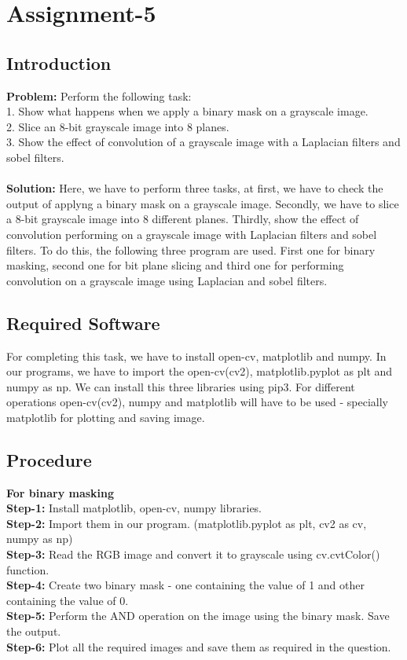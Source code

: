 \documentclass{article}
\begin{document}
{
    \section{Assignment-5}
    \subsection{Introduction}
    \textbf {Problem: }
    Perform the following task:\\
    1. Show what happens when we apply a binary mask on a grayscale image.\\
    2. Slice an 8-bit grayscale image into 8 planes.\\
    3. Show the effect of convolution of a grayscale image with a Laplacian filters and sobel filters.\\
    \\
    \textbf{Solution: }
    Here, we have to perform three tasks, at first, we have to check the output of applyng a binary mask on a grayscale image. Secondly, we have to slice a 8-bit grayscale image into 8 different planes. Thirdly, show the effect of convolution performing on a grayscale image with Laplacian filters and sobel filters. To do this, the following three program are used. First one for binary masking, second one for bit plane slicing and third one for performing convolution on a grayscale image using Laplacian and sobel filters.
    \\
    
    \subsection{Required Software}
    For completing this task, we have to install open-cv, matplotlib and numpy. In our programs, we have to import the open-cv(cv2), matplotlib.pyplot as plt and numpy as np. We can install this three libraries using pip3. For different operations open-cv(cv2), numpy and matplotlib will have to be used - specially matplotlib for plotting and saving image. 
    \\
    
    \subsection{Procedure}
    \textbf{For binary masking}\\
    \textbf{Step-1:}
    Install matplotlib, open-cv, numpy libraries.\\
    \textbf{Step-2:}
    Import them in our program. (matplotlib.pyplot as plt, cv2 as cv, numpy as np)\\
    \textbf{Step-3:}
    Read the RGB image and convert it to grayscale using cv.cvtColor() function.\\
    \textbf{Step-4:}
    Create two binary mask - one containing the value of 1 and other containing the value of 0.\\
    \textbf{Step-5:}
    Perform the AND operation on the image using the binary mask. Save the output.\\
    \textbf{Step-6:}
    Plot all the required images and save them as required in the question.\\
    
}
\end{document}
